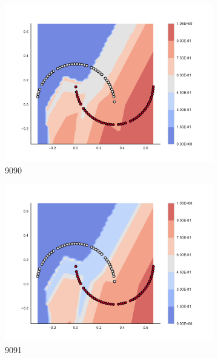         \begin{figure}[h]\ContinuedFloat
        
\begin{subfigure}[b]{0.09\textwidth}
    \includegraphics[clip, trim=2.35cm 1.75cm 4.5cm 0cm,width=\textwidth]{img/convergence/9090.pdf}
    \caption{9090}
    \label{fig:convergence_9090}
\end{subfigure}
%
\begin{subfigure}[b]{0.09\textwidth}
    \includegraphics[clip, trim=2.35cm 1.75cm 4.5cm 0cm,width=\textwidth]{img/convergence/9091.pdf}
    \caption{9091}
    \label{fig:convergence_9091}
\end{subfigure}
%
\begin{subfigure}[b]{0.09\textwidth}

\end{subfigure}
\end{figure}
